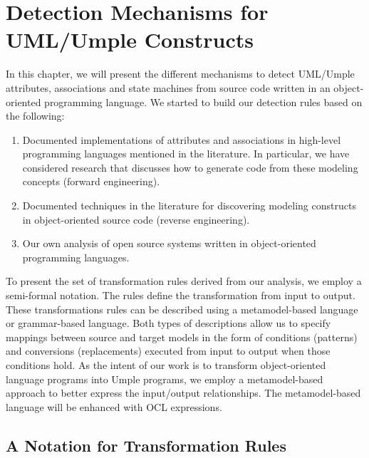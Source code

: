 \lhead{\emph{\leftmark}}  

\chapter{Detection Mechanisms for UML/Umple Constructs}
\label{chap:detections}

In this chapter, we will present the different mechanisms to detect UML/Umple attributes, associations and state machines from source code written in an object-oriented programming language. We started to build our detection rules based on the following:

\begin{enumerate}

\item Documented implementations of attributes and associations in high-level programming languages mentioned in the literature. In particular, we have considered research that discusses how to generate code from these modeling concepts (forward engineering).

\item Documented techniques in the literature for discovering  modeling constructs in object-oriented source code (reverse engineering).

\item Our own analysis of open source systems written in object-oriented programming languages.

\end{enumerate}

To present the set of transformation rules derived from our analysis, we  employ a semi-formal notation. The rules define the transformation from input to output. These transformations rules can be described using a metamodel-based language or grammar-based language. Both types of descriptions allow us to specify mappings between source and target models in the form of conditions (patterns) and conversions (replacements) executed from input to output when those conditions hold. As the intent of our work is to transform object-oriented  language programs into Umple programs, we  employ a metamodel-based approach to better express the input/output relationships. The metamodel-based language will be enhanced with OCL \cite{WarmerOCL2003} expressions. 

\section{A Notation for Transformation Rules}
\label{sec:2ModelTransformation}


